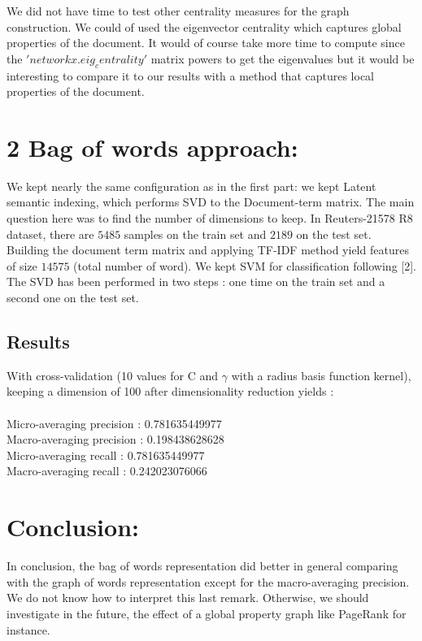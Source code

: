 We did not have time to test other centrality measures for the graph construction. We could of used the eigenvector centrality which captures global properties of the document. It would of course take more time to compute since the $'networkx.eig_centrality'$ matrix powers to get the eigenvalues but it would be interesting to compare it to our results with a method that captures local properties of the document.
\section*{2 Bag of words approach:}

We kept nearly the same configuration as in the first part: we kept Latent semantic indexing, which performs SVD to the Document-term matrix. 
The main question here was to find the number of dimensions to keep. In Reuters-21578 R8 dataset, there are $5485$ samples on the train set and $2189$ on the test set. Building the document term matrix and applying TF-IDF method yield features of size $14575$ (total number of word). 
We kept SVM for classification following [2]. The SVD has been performed in two steps : one time on the train set and a second one on the test set.
\subsection*{Results}
With cross-validation (10 values for C and $\gamma$ with a radius basis function kernel), keeping a dimension of 100 after dimensionality reduction yields :~\\
~\\
Micro-averaging precision : 0.781635449977~\\
Macro-averaging precision : 0.198438628628~\\
Micro-averaging recall : 0.781635449977~\\
Macro-averaging recall : 0.242023076066~\\

\section*{Conclusion:}

In conclusion, the bag of words representation did better in general comparing with the graph of words representation except for the macro-averaging precision. We do not know how to interpret this last remark. Otherwise, we should investigate in the future, the effect of a global property graph like PageRank for instance.

